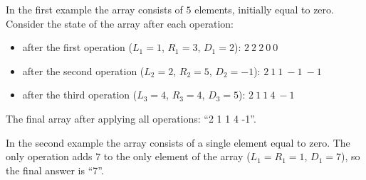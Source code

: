 In the first example the array consists of $5$ elements, initially equal to zero. Consider the state of the array after each operation:

\begin{itemize}
\item after the first operation ($L_1 = 1$, $R_1 = 3$, $D_1 = 2$): $2\ 2\ 2\ 0\ 0$
\item after the second operation ($L_2 = 2$, $R_2 = 5$, $D_2 = -1$): $2\ 1\ 1\ -1\ -1$
\item after the third operation ($L_3 = 4$, $R_3 = 4$, $D_3 = 5$): $2\ 1\ 1\ 4\ -1$
\end{itemize}

The final array after applying all operations: ``2 1 1 4 -1''.

In the second example the array consists of a single element equal to zero. The only operation adds $7$ to the only element of the array ($L_1 = R_1 = 1$, $D_1 = 7$), so the final answer is ``7''.
